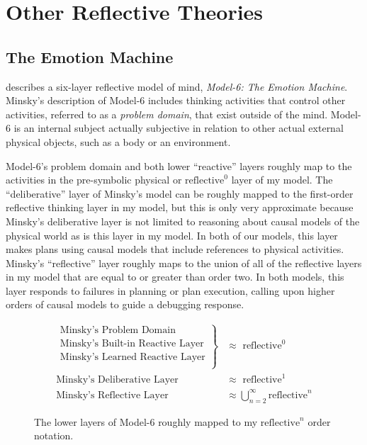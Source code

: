 \chapter{Other Reflective Theories}
\label{chapter:other_reflective_theories}

\section{The Emotion Machine}
\label{backreference:self_reflective_self_conscious}

\cite{minsky:2006} describes a six-layer reflective model of mind,
\emph{\mbox{Model-6}: The Emotion Machine}.  Minsky's description of
\mbox{Model-6} includes thinking activities that control other
activities, referred to as a \emph{problem domain}, that exist outside
of the mind.  \mbox{Model-6} is an internal subject actually
subjective in relation to other actual external physical objects, such
as a body or an environment.

\mbox{Model-6}'s problem domain and both lower ``reactive'' layers
roughly map to the activities in the pre-symbolic physical or
$\text{reflective}^0$ layer of my model.  The ``deliberative'' layer
of Minsky's model can be roughly mapped to the first-order reflective
thinking layer in my model, but this is only very approximate because
Minsky's deliberative layer is not limited to reasoning about causal
models of the physical world as is this layer in my model.  In both of
our models, this layer makes plans using causal models that include
references to physical activities.  Minsky's ``reflective'' layer
roughly maps to the union of all of the reflective layers in my model
that are equal to or greater than order two.  In both models, this
layer responds to failures in planning or plan execution, calling upon
higher orders of causal models to guide a debugging response.

\begin{figure}[bth]
\begin{align*}
\left.
  \begin{array}{l}
    \text{Minsky's Problem Domain}\\
    \text{Minsky's Built-in Reactive Layer}\\
    \text{Minsky's Learned Reactive Layer}\\
  \end{array}
\right\}                            &{\approx} \text{ reflective}^0 \\
\text{Minsky's Deliberative Layer } &{\approx} \text{ reflective}^1 \\
\text{Minsky's Reflective Layer }   &{\approx} \bigcup_{n=2}^{\infty}{\text{reflective}^n}
\end{align*}
\caption{The lower layers of Model-6 roughly mapped to my
  $\text{reflective}^n$ order notation.}
\label{figure:model_6_as_reflective_order_notation}
\end{figure}

